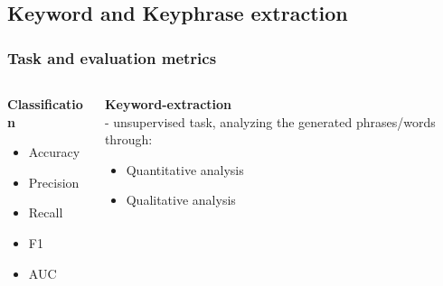 \documentclass{beamer}
\begin{document}





\subsection{Keyword and Keyphrase extraction}
\begin{frame}
\frametitle{Task and evaluation metrics}

\begin{columns}[T]

\begin{column}{0.5\textwidth}
\textbf{Classification}
\begin{itemize}
\item Accuracy
\item Precision
\item Recall
\item F1
\item AUC
\end{itemize}

\end{column}
\vrule{}
\begin{column}{0.5\textwidth}
\textbf{Keyword-extraction}
\\ - unsupervised task, analyzing the generated phrases/words through:
\begin{itemize}
\item Quantitative analysis
\item Qualitative analysis
\end{itemize}

\end{column}
\end{columns}
\end{frame}
\end{document}

